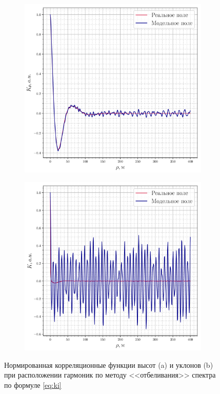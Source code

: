 \begin{figure}[ht]
    \centering
    \begin{subfigure}{0.49\linewidth}
        \centering
        \includegraphics[width=\linewidth]{fig/correlation_height_height2.png}
        \caption{}
    \end{subfigure}
    \begin{subfigure}{0.49\linewidth}
        \centering
        \includegraphics[width=\linewidth]{fig/correlation_angles_height2.png}
        \caption{}
    \end{subfigure}
    \caption{ Нормированная корреляционные функции высот (a) и уклонов (b) при расположении гармоник
    по методу <<отбеливания>> спектра по формуле \eqref{eq:ki} }
    \label{fig:ki}
\end{figure}

